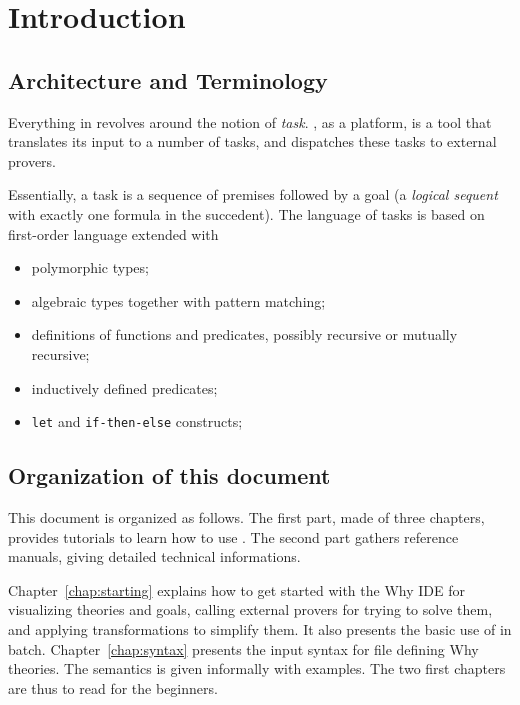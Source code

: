 
\chapter{Introduction}

\section{Architecture and Terminology}

Everything in \why revolves around the notion of
\emph{task}.  \why, as a platform, is a tool that
translates its input to a number of tasks, and dispatches these tasks
to external provers. 

Essentially, a task is a sequence of premises followed by a goal
(\ie a \emph{logical sequent} with exactly one formula in the
succedent). The language of tasks is based on first-order language
extended with 
\begin{itemize}
\item polymorphic types;
\item algebraic types together with pattern matching;
\item definitions of functions and predicates, possibly recursive or
  mutually recursive;
\item inductively defined predicates;
\item \texttt{let} and \texttt{if-then-else} constructs;
\end{itemize}


\section{Organization of this document}

This document is organized as follows. The first part, made of three chapters, provides tutorials to learn how to use \why. The second part gathers reference
manuals, giving detailed technical informations.

Chapter~\ref{chap:starting} explains how to get started with the Why
IDE for visualizing theories and goals, calling external provers for
trying to solve them, and applying transformations to simplify
them. It also presents the basic use of \why in
batch. Chapter~\ref{chap:syntax} presents the input syntax for file
defining Why theories. The semantics is given informally with
examples.  The two first chapters are thus to read for the beginners.

